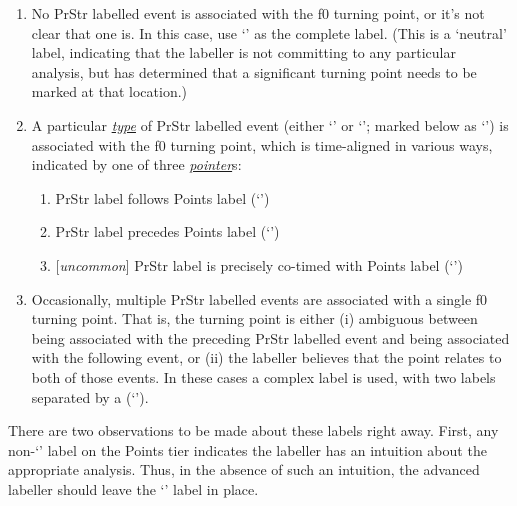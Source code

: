 \begin{enumerate} \def\labelenumi{\arabic{enumi}.}
\item No PrStr labelled event is associated with the f0 turning point, or it’s not clear that one is. In this case, use ‘’ as the complete label. (This is a ‘neutral’ label, indicating that the labeller is not committing to any particular analysis, but has determined that a significant turning point needs to be marked at that location.)
\item A particular \textit{\uline{type}} of PrStr labelled event (either ‘\textlabel{*}’ or ‘\textlabel{]}’; marked below as ‘\textlabel{\_}’) is associated with the f0 turning point, which is time-aligned in various ways, indicated by one of three \textit{\uline{pointer}}s:

 \begin{enumerate} \def\labelenumii{\alph{enumii}.}
\item PrStr label follows Points label (‘\textlabel{\_>}’)
\item PrStr label precedes Points label (‘\textlabel{\_<}’)
\item {[\textit{uncommon}]} PrStr label is precisely co-timed with Points label (‘’) \end{enumerate}
\item Occasionally, multiple PrStr labelled events are associated with a single f0 turning point. That is, the turning point is either (i) ambiguous between being associated with the preceding PrStr labelled event and being associated with the following event, or (ii) the labeller believes that the point relates to both of those events. In these cases a complex label is used, with two labels separated by a \textlabel{/} (‘\textlabel{\_</\_>}’). \end{enumerate}

There are two observations to be made about these labels right away. First, any non-‘’ label on the Points tier indicates the labeller has an intuition about the appropriate analysis. Thus, in the absence of such an intuition, the advanced labeller should leave the ‘’ label in place.

